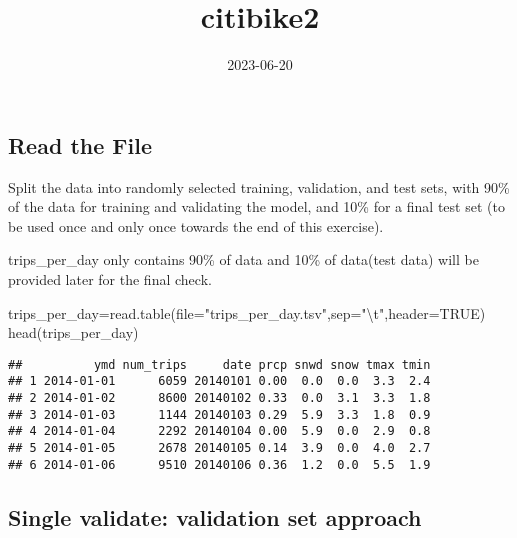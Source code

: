 \documentclass[
]{article}
\title{citibike2}
\author{}
\date{\vspace{-2.5em}2023-06-20}
\newenvironment{Shaded}{\begin{snugshade}}{\end{snugshade}}
\newcommand{\AttributeTok}[1]{\textcolor[rgb]{0.77,0.63,0.00}{#1}}
\newcommand{\ConstantTok}[1]{\textcolor[rgb]{0.00,0.00,0.00}{#1}}
\newcommand{\FunctionTok}[1]{\textcolor[rgb]{0.00,0.00,0.00}{#1}}
\newcommand{\NormalTok}[1]{#1}
\newcommand{\OtherTok}[1]{\textcolor[rgb]{0.56,0.35,0.01}{#1}}
\newcommand{\SpecialCharTok}[1]{\textcolor[rgb]{0.00,0.00,0.00}{#1}}
\newcommand{\StringTok}[1]{\textcolor[rgb]{0.31,0.60,0.02}{#1}}
\begin{document}
\maketitle

\hypertarget{read-the-file}{%
\subsection{Read the File}\label{read-the-file}}

Split the data into randomly selected training, validation, and test
sets, with 90\% of the data for training and validating the model, and
10\% for a final test set (to be used once and only once towards the end
of this exercise).

trips\_per\_day only contains 90\% of data and 10\% of data(test data)
will be provided later for the final check.

\begin{Shaded}
\begin{Highlighting}[]
\NormalTok{trips\_per\_day}\OtherTok{=}\FunctionTok{read.table}\NormalTok{(}\AttributeTok{file=}\StringTok{"trips\_per\_day.tsv"}\NormalTok{,}\AttributeTok{sep=}\StringTok{"}\SpecialCharTok{\textbackslash{}t}\StringTok{"}\NormalTok{,}\AttributeTok{header=}\ConstantTok{TRUE}\NormalTok{)}
\FunctionTok{head}\NormalTok{(trips\_per\_day)}
\end{Highlighting}
\end{Shaded}

\begin{verbatim}
##          ymd num_trips     date prcp snwd snow tmax tmin
## 1 2014-01-01      6059 20140101 0.00  0.0  0.0  3.3  2.4
## 2 2014-01-02      8600 20140102 0.33  0.0  3.1  3.3  1.8
## 3 2014-01-03      1144 20140103 0.29  5.9  3.3  1.8  0.9
## 4 2014-01-04      2292 20140104 0.00  5.9  0.0  2.9  0.8
## 5 2014-01-05      2678 20140105 0.14  3.9  0.0  4.0  2.7
## 6 2014-01-06      9510 20140106 0.36  1.2  0.0  5.5  1.9
\end{verbatim}

\hypertarget{single-validate-validation-set-approach}{%
\subsection{Single validate: validation set
approach}\label{single-validate-validation-set-approach}}
\end{document}
